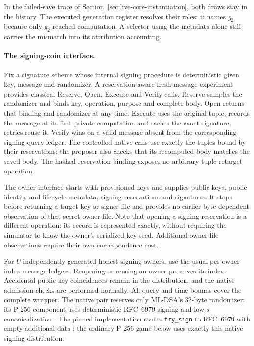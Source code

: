 \documentclass[pdflatex]{sn-jnl}
\theoremstyle{thmstyleone}
\theoremstyle{thmstylethree}
\theoremstyle{thmstyletwo}
\begin{document}
In the failed-save trace of Section~\ref{sec:live-core-instantiation},
both draws stay in the history. The executed generation register resolves
their roles: it names $g_2$ because only $g_2$ reached computation.
A selector using the metadata alone still carries the mismatch into its
attribution accounting.

\paragraph{The signing-coin interface.}
Fix a signature scheme whose internal signing procedure is deterministic
given key, message and randomizer. A reservation-aware fresh-message
experiment provides classical Reserve, Open, Execute and Verify calls.
Reserve samples the randomizer and binds key, operation, purpose
and complete body. Open returns that binding and randomizer at any time.
Execute uses the original tuple, records the message at its first private
computation and caches the exact signature; retries reuse it. Verify wins
on a valid message absent from the corresponding signing-query ledger.
The controlled native calls use exactly the tuples bound by their
reservations; the proposer also checks that its recomputed body matches
the saved body. The hashed reservation binding exposes no arbitrary
tuple-retarget operation.

The owner interface starts with provisioned keys and supplies public keys,
public identity and lifecycle metadata, signing reservations and signatures.
It stops before returning a target key or signer file and provides no earlier
byte-dependent observation of that secret owner file. Note that opening
a signing reservation is a different operation: its record is represented
exactly, without requiring the simulator to know the owner's serialized
key seed. Additional owner-file observations require their own
correspondence cost.

For $U$ independently generated honest signing owners, use the usual
per-owner-index message ledgers. Reopening or reusing an owner preserves
its index. Accidental public-key coincidences remain in the distribution,
and the native admission checks are performed normally. All query and
time bounds cover the complete wrapper. The native pair reserves only
ML-DSA's 32-byte randomizer; its P-256 component uses deterministic
RFC~6979 signing and low-$s$ canonicalization
\cite{rfc6979,fips204}. The pinned implementation routes
\texttt{try\_sign} to RFC~6979 with empty additional data
\cite{rustcryptoEcdsa017}; the ordinary
P-256 game below uses exactly this native signing distribution.
\end{document}
